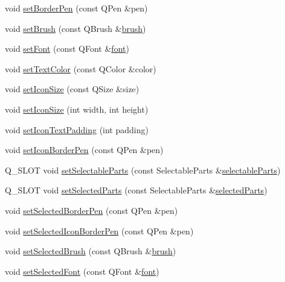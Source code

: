 \begin{DoxyCompactItemize}
\item 
void \hyperlink{class_q_c_p_legend_a866a9e3f5267de7430a6c7f26a61db9f}{set\+Border\+Pen} (const Q\+Pen \&pen)
\item 
void \hyperlink{class_q_c_p_legend_a497bbcd38baa3598c08e2b3f48103f23}{set\+Brush} (const Q\+Brush \&\hyperlink{class_q_c_p_legend_a7e5d2766e7d724f399022be8a4e8a2cb}{brush})
\item 
void \hyperlink{class_q_c_p_legend_aa4cda8499e3cb0f3be415edc02984c73}{set\+Font} (const Q\+Font \&\hyperlink{class_q_c_p_legend_a5cf8b840bc02f7bf4edb8dde400d0f41}{font})
\item 
void \hyperlink{class_q_c_p_legend_ae1eb239ff4a4632fe1b6c3e668d845c6}{set\+Text\+Color} (const Q\+Color \&color)
\item 
void \hyperlink{class_q_c_p_legend_a8b0740cce488bf7010da6beda6898984}{set\+Icon\+Size} (const Q\+Size \&size)
\item 
void \hyperlink{class_q_c_p_legend_a96b1a37fd4ee6a9778e6e54fe56ab6c2}{set\+Icon\+Size} (int width, int height)
\item 
void \hyperlink{class_q_c_p_legend_a62973bd69d5155e8ea3141366e8968f6}{set\+Icon\+Text\+Padding} (int padding)
\item 
void \hyperlink{class_q_c_p_legend_a2f2c93d18a651f4ff294bb3f026f49b8}{set\+Icon\+Border\+Pen} (const Q\+Pen \&pen)
\item 
Q\+\_\+\+S\+L\+OT void \hyperlink{class_q_c_p_legend_a9ce60aa8bbd89f62ae4fa83ac6c60110}{set\+Selectable\+Parts} (const Selectable\+Parts \&\hyperlink{class_q_c_p_legend_aa90c7fdbad7a0e93527bafb1f1f49a43}{selectable\+Parts})
\item 
Q\+\_\+\+S\+L\+OT void \hyperlink{class_q_c_p_legend_a2aee309bb5c2a794b1987f3fc97f8ad8}{set\+Selected\+Parts} (const Selectable\+Parts \&\hyperlink{class_q_c_p_legend_abbbf1b2d6a149013527ed87b0780894a}{selected\+Parts})
\item 
void \hyperlink{class_q_c_p_legend_a2c35d262953a25d96b6112653fbefc88}{set\+Selected\+Border\+Pen} (const Q\+Pen \&pen)
\item 
void \hyperlink{class_q_c_p_legend_ade93aabe9bcccaf9cf46cec22c658027}{set\+Selected\+Icon\+Border\+Pen} (const Q\+Pen \&pen)
\item 
void \hyperlink{class_q_c_p_legend_a875227f3219c9799464631dec5e8f1bd}{set\+Selected\+Brush} (const Q\+Brush \&\hyperlink{class_q_c_p_legend_a7e5d2766e7d724f399022be8a4e8a2cb}{brush})
\item 
void \hyperlink{class_q_c_p_legend_ab580a01c3c0a239374ed66c29edf5ad2}{set\+Selected\+Font} (const Q\+Font \&\hyperlink{class_q_c_p_legend_a5cf8b840bc02f7bf4edb8dde400d0f41}{font})

\end{DoxyCompactItemize}
